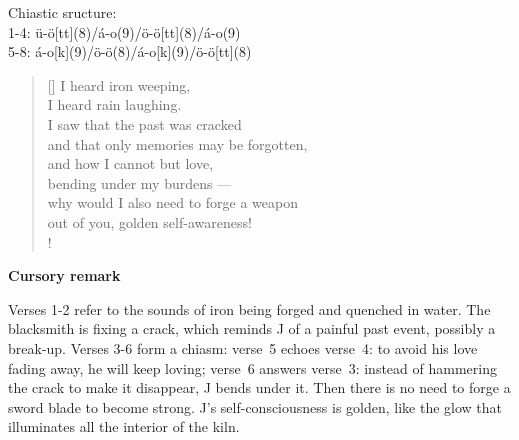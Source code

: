 \documentclass[a4paper,12pt,twoside,final]{book}
\begin{document}
\noindent Chiastic sructure: \\
1-4: ü-ö[tt](8)/á-o(9)/ö-ö[tt](8)/á-o(9) \\
5-8: á-o[k](9)/ö-ö(8)/á-o[k](9)/ö-ö[tt](8)

\newpage


\settowidth{\versewidth}{and that only a memory can be forgotten;}

\begin{verse}[\versewidth]
  I heard iron weeping, \\
  I heard rain laughing. \\
  I saw that the past was cracked \\
  and that only memories may be forgotten, \\
  and how I cannot but love, \\
  bending under my burdens --- \\
  why would I also need to forge a weapon \\
  out of you, golden self-awareness! \\!
\end{verse}


\bigskip

\noindent \textbf{Cursory remark}

\medskip

Verses 1-2 refer to the sounds of iron being forged and quenched in
water. The blacksmith is fixing a crack, which reminds J of a painful
past event, possibly a break\hyp{}up. Verses 3-6 form a chiasm:
verse~5 echoes verse~4: to avoid his love fading away, he will keep
loving; verse~6 answers verse~3: instead of hammering the crack to
make it disappear, J bends under it. Then there is no need to forge a
sword blade to become strong. J's self\hyp{}consciousness is golden,
like the glow that illuminates all the interior of the kiln.

\newpage

\settowidth{\versewidth}{s hogy nem tudok mást, mint szeretni,}
\end{document}
